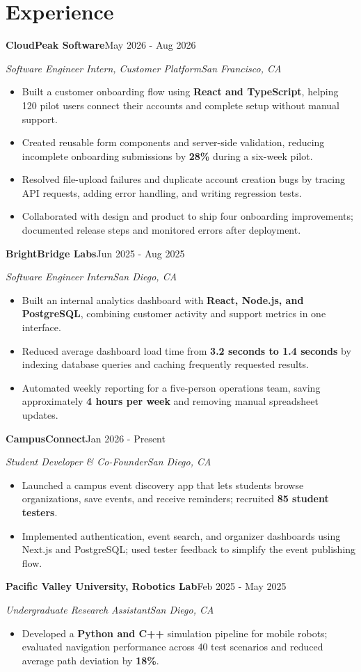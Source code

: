 \documentclass[letterpaper,10pt]{article}
\newcommand{\entry}[2]{\noindent\textbf{#1}\hfill #2\par}
\newcommand{\role}[2]{\noindent\textit{#1}\hfill\textit{#2}\par}
\begin{document}
\section{Experience}
\entry{CloudPeak Software}{May 2026 - Aug 2026}
\role{Software Engineer Intern, Customer Platform}{San Francisco, CA}
\begin{itemize}
\item Built a customer onboarding flow using \textbf{React and TypeScript}, helping 120 pilot users connect their accounts and complete setup without manual support.
\item Created reusable form components and server-side validation, reducing incomplete onboarding submissions by \textbf{28\%} during a six-week pilot.
\item Resolved file-upload failures and duplicate account creation bugs by tracing API requests, adding error handling, and writing regression tests.
\item Collaborated with design and product to ship four onboarding improvements; documented release steps and monitored errors after deployment.
\end{itemize}
\entry{BrightBridge Labs}{Jun 2025 - Aug 2025}
\role{Software Engineer Intern}{San Diego, CA}
\begin{itemize}
\item Built an internal analytics dashboard with \textbf{React, Node.js, and PostgreSQL}, combining customer activity and support metrics in one interface.
\item Reduced average dashboard load time from \textbf{3.2 seconds to 1.4 seconds} by indexing database queries and caching frequently requested results.
\item Automated weekly reporting for a five-person operations team, saving approximately \textbf{4 hours per week} and removing manual spreadsheet updates.
\end{itemize}
\entry{CampusConnect}{Jan 2026 - Present}
\role{Student Developer \& Co-Founder}{San Diego, CA}
\begin{itemize}
\item Launched a campus event discovery app that lets students browse organizations, save events, and receive reminders; recruited \textbf{85 student testers}.
\item Implemented authentication, event search, and organizer dashboards using Next.js and PostgreSQL; used tester feedback to simplify the event publishing flow.
\end{itemize}
\entry{Pacific Valley University, Robotics Lab}{Feb 2025 - May 2025}
\role{Undergraduate Research Assistant}{San Diego, CA}
\begin{itemize}
\item Developed a \textbf{Python and C++} simulation pipeline for mobile robots; evaluated navigation performance across 40 test scenarios and reduced average path deviation by \textbf{18\%}.
\end{itemize}
\end{document}
